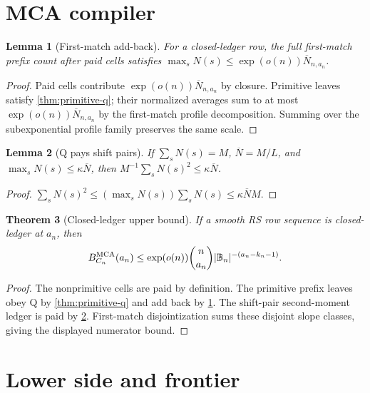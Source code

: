 \documentclass[11pt,a4paper]{amsart}
\numberwithin{equation}{section}
\newtheorem{theorem}{Theorem}[section]
\newtheorem{lemma}[theorem]{Lemma}
\theoremstyle{remark}
\newcommand{\B}{\mathbb B}
\newcommand{\barN}{\overline N}
\begin{document}
\section{MCA compiler}

\begin{lemma}[First-match add-back]\label{lem:addback}
For a closed-ledger row, the full first-match prefix count after paid cells satisfies \(\max_sN(s)\le\exp(o(n))\barN_{n,a_n}\).
\end{lemma}

\begin{proof}
Paid cells contribute \(\exp(o(n))\barN_{n,a_n}\) by closure.  Primitive leaves satisfy \cref{thm:primitive-q}; their normalized averages sum to at most \(\exp(o(n))\barN_{n,a_n}\) by the first-match profile decomposition.  Summing over the subexponential profile family preserves the same scale.
\end{proof}

\begin{lemma}[Q pays shift pairs]\label{lem:q-sp}
If \(\sum_sN(s)=M\), \(\barN=M/L\), and \(\max_sN(s)\le \kappa\barN\), then \(M^{-1}\sum_sN(s)^2\le\kappa\barN\).
\end{lemma}

\begin{proof}
\(\sum_sN(s)^2\le(\max_sN(s))\sum_sN(s)\le\kappa\barN M\).
\end{proof}

\begin{theorem}[Closed-ledger upper bound]\label{thm:upper}
If a smooth RS row sequence is closed-ledger at \(a_n\), then
\[
        B_{C_n}^{\rm MCA}(a_n)
        \le \exp(o(n))\binom n{a_n}|\B_n|^{-(a_n-k_n-1)} .
\]
\end{theorem}

\begin{proof}
The nonprimitive cells are paid by definition.  The primitive prefix leaves obey Q by \cref{thm:primitive-q} and add back by \cref{lem:addback}.  The shift-pair second-moment ledger is paid by \cref{lem:q-sp}.  First-match disjointization sums these disjoint slope classes, giving the displayed numerator bound.
\end{proof}

\section{Lower side and frontier}
\end{document}
